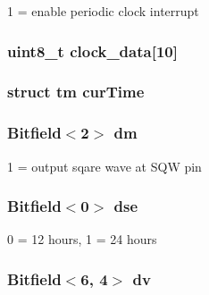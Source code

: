 1 = enable periodic clock interrupt \hypertarget{classMC146818_a574a6ffc3b886b66eb7f05f4a4abc0d4}{
\subsubsection[{clock\_\-data}]{\setlength{\rightskip}{0pt plus 5cm}uint8\_\-t {\bf clock\_\-data}\mbox{[}10\mbox{]}}}
\label{classMC146818_a574a6ffc3b886b66eb7f05f4a4abc0d4}
\hypertarget{classMC146818_a1fa96dc80ff12927216cb2ce72306e55}{
\subsubsection[{curTime}]{\setlength{\rightskip}{0pt plus 5cm}struct tm {\bf curTime}}}
\label{classMC146818_a1fa96dc80ff12927216cb2ce72306e55}
\hypertarget{classMC146818_a0c41402e021fa90f547adf9392abcc8d}{
\subsubsection[{dm}]{\setlength{\rightskip}{0pt plus 5cm}Bitfield$<$2$>$ {\bf dm}}}
\label{classMC146818_a0c41402e021fa90f547adf9392abcc8d}


1 = output sqare wave at SQW pin \hypertarget{classMC146818_a08a594a517342cdd7b68781496ff83cb}{
\subsubsection[{dse}]{\setlength{\rightskip}{0pt plus 5cm}Bitfield$<$0$>$ {\bf dse}}}
\label{classMC146818_a08a594a517342cdd7b68781496ff83cb}


0 = 12 hours, 1 = 24 hours \hypertarget{classMC146818_a6cb58630092effe3e8ef2d674d7a3d1a}{
\subsubsection[{dv}]{\setlength{\rightskip}{0pt plus 5cm}Bitfield$<$6, 4$>$ {\bf dv}}}
\label{classMC146818_a6cb58630092effe3e8ef2d674d7a3d1a}


